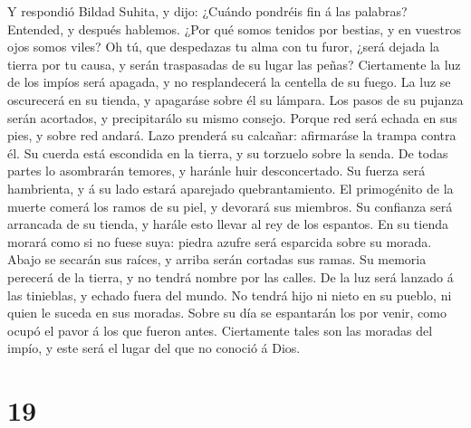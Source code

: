 Y respondió Bildad Suhita, y dijo:  ¿Cuándo
pondréis fin á las palabras? Entended, y después hablemos.
 ¿Por qué somos tenidos por bestias, y en vuestros ojos
somos viles?  Oh tú, que despedazas tu alma con tu furor,
¿será dejada la tierra por tu causa, y serán traspasadas de su lugar las
peñas?  Ciertamente la luz de los impíos será apagada, y
no resplandecerá la centella de su fuego.  La luz se
oscurecerá en su tienda, y apagaráse sobre él su lámpara. 
Los pasos de su pujanza serán acortados, y precipitarálo su mismo
consejo.  Porque red será echada en sus pies, y sobre red
andará.  Lazo prenderá su calcañar: afirmaráse la trampa
contra él.  Su cuerda está escondida en la tierra, y su
torzuelo sobre la senda.  De todas partes lo asombrarán
temores, y haránle huir desconcertado.  Su fuerza será
hambrienta, y á su lado estará aparejado quebrantamiento.
 El primogénito de la muerte comerá los ramos de su piel,
y devorará sus miembros.  Su confianza será arrancada de
su tienda, y harále esto llevar al rey de los espantos. 
En su tienda morará como si no fuese suya: piedra azufre será esparcida
sobre su morada.  Abajo se secarán sus raíces, y arriba
serán cortadas sus ramas.  Su memoria perecerá de la
tierra, y no tendrá nombre por las calles.  De la luz
será lanzado á las tinieblas, y echado fuera del mundo. 
No tendrá hijo ni nieto en su pueblo, ni quien le suceda en sus moradas.
 Sobre su día se espantarán los por venir, como ocupó el
pavor á los que fueron antes.  Ciertamente tales son las
moradas del impío, y este será el lugar del que no conoció á Dios.

\hypertarget{section-18}{%
\section{19}\label{section-18}}

